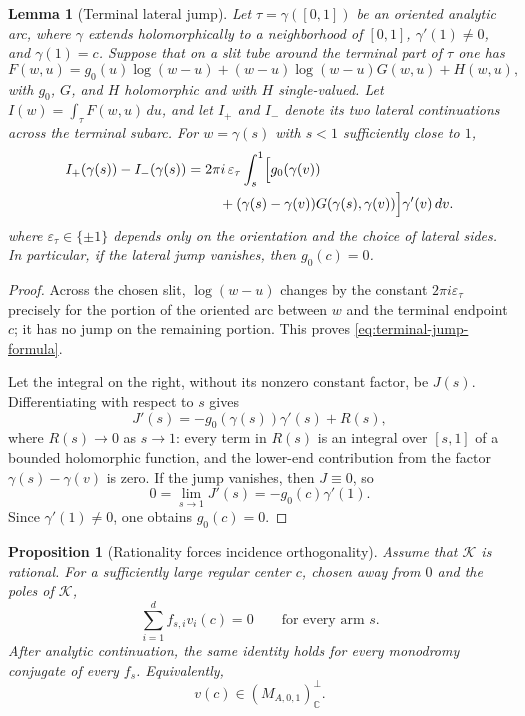 \documentclass[11pt]{article}
\numberwithin{equation}{section}
\newtheorem{proposition}[proposition]{Proposition}
\newtheorem{lemma}[lemma]{Lemma}
\theoremstyle{definition}
\theoremstyle{remark}
\newcommand{\C}{\mathbb C}
\newcommand{\Kcal}{\mathcal K}
\begin{document}
\begin{lemma}[Terminal lateral jump]\label{lem:Volterra}
Let $\tau=\gamma([0,1])$ be an oriented analytic arc, where $\gamma$ extends
holomorphically to a neighborhood of $[0,1]$, $\gamma'(1)\neq0$, and
$\gamma(1)=c$.  Suppose that on a slit tube around the terminal part of
$\tau$ one has
\[
  F(w,u)=g_0(u)\log(w-u)
  +(w-u)\log(w-u)G(w,u)+H(w,u),
\]
with $g_0$, $G$, and $H$ holomorphic and with $H$ single-valued.  Let
$I(w)=\int_\tau F(w,u)\,du$, and let $I_+$ and $I_-$ denote its two lateral
continuations across the terminal subarc.  For $w=\gamma(s)$ with $s<1$
sufficiently close to $1$,
\begin{equation}\label{eq:terminal-jump-formula}
\begin{aligned}
 I_+(\gamma(s))-I_-(\gamma(s))
  ={}&2\pi i\,\varepsilon_\tau
  \int_s^1\Bigl[g_0(\gamma(v))\\
 &\quad +(\gamma(s)-\gamma(v))
  G(\gamma(s),\gamma(v))\Bigr]\gamma'(v)\,dv.
\end{aligned}
\end{equation}
where $\varepsilon_\tau\in\{\pm1\}$ depends only on the orientation and the
choice of lateral sides.  In particular, if the lateral jump vanishes,
then $g_0(c)=0$.
\end{lemma}

\begin{proof}
Across the chosen slit, $\log(w-u)$ changes by the constant
$2\pi i\varepsilon_\tau$ precisely for the portion of the oriented arc
between $w$ and the terminal endpoint $c$; it has no jump on the remaining
portion.  This proves \eqref{eq:terminal-jump-formula}.

Let the integral on the right, without its nonzero constant factor, be
$J(s)$.  Differentiating with respect to $s$ gives
\[
  J'(s)=-g_0(\gamma(s))\gamma'(s)+R(s),
\]
where $R(s)\to0$ as $s\to1$: every term in $R(s)$ is an integral over
$[s,1]$ of a bounded holomorphic function, and the lower-end contribution
from the factor $\gamma(s)-\gamma(v)$ is zero.  If the jump vanishes, then
$J\equiv0$, so
\[
  0=\lim_{s\to1}J'(s)=-g_0(c)\gamma'(1).
\]
Since $\gamma'(1)\neq0$, one obtains $g_0(c)=0$.
\end{proof}

\begin{proposition}[Rationality forces incidence orthogonality]\label{prop:rational-orthogonality}
Assume that $\Kcal$ is rational.  For a sufficiently large regular center
$c$, chosen away from $0$ and the poles of $\Kcal$,
\begin{equation}\label{eq:incidence-relations}
  \sum_{i=1}^d f_{s,i}v_i(c)=0
  \qquad\text{for every arm }s.
\end{equation}
After analytic continuation, the same identity holds for every monodromy
conjugate of every $f_s$.  Equivalently,
\begin{equation}\label{eq:v-orthogonal}
  v(c)\in(M_{A,0,1})_\C^\perp.
\end{equation}
\end{proposition}
\end{document}
